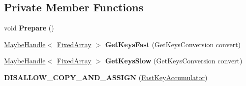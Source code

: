 \subsection*{Private Member Functions}
\begin{DoxyCompactItemize}
\item 
void {\bfseries Prepare} ()\hypertarget{classv8_1_1internal_1_1_fast_key_accumulator_ab0c30a7f6645474a91d23b8d1fa37be2}{}\label{classv8_1_1internal_1_1_fast_key_accumulator_ab0c30a7f6645474a91d23b8d1fa37be2}

\item 
\hyperlink{classv8_1_1internal_1_1_maybe_handle}{Maybe\+Handle}$<$ \hyperlink{classv8_1_1internal_1_1_fixed_array}{Fixed\+Array} $>$ {\bfseries Get\+Keys\+Fast} (Get\+Keys\+Conversion convert)\hypertarget{classv8_1_1internal_1_1_fast_key_accumulator_a6f52584d8f7dc7e3894c763884f303f7}{}\label{classv8_1_1internal_1_1_fast_key_accumulator_a6f52584d8f7dc7e3894c763884f303f7}

\item 
\hyperlink{classv8_1_1internal_1_1_maybe_handle}{Maybe\+Handle}$<$ \hyperlink{classv8_1_1internal_1_1_fixed_array}{Fixed\+Array} $>$ {\bfseries Get\+Keys\+Slow} (Get\+Keys\+Conversion convert)\hypertarget{classv8_1_1internal_1_1_fast_key_accumulator_a7ff62ff9e0eacf4d49ade3adaf98e029}{}\label{classv8_1_1internal_1_1_fast_key_accumulator_a7ff62ff9e0eacf4d49ade3adaf98e029}

\item 
{\bfseries D\+I\+S\+A\+L\+L\+O\+W\+\_\+\+C\+O\+P\+Y\+\_\+\+A\+N\+D\+\_\+\+A\+S\+S\+I\+GN} (\hyperlink{classv8_1_1internal_1_1_fast_key_accumulator}{Fast\+Key\+Accumulator})\hypertarget{classv8_1_1internal_1_1_fast_key_accumulator_aee7b83d105db2969b19166a255dfa97b}{}\label{classv8_1_1internal_1_1_fast_key_accumulator_aee7b83d105db2969b19166a255dfa97b}

\end{DoxyCompactItemize}
